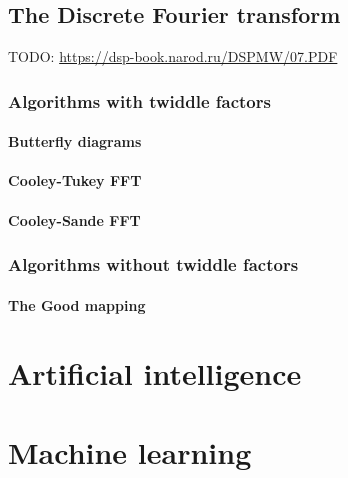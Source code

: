\section{The Discrete Fourier transform}
TODO: \url{https://dsp-book.narod.ru/DSPMW/07.PDF}
\subsection{Algorithms with twiddle factors}
\subsubsection{Butterfly diagrams}
\subsubsection{Cooley-Tukey FFT}
\subsubsection{Cooley-Sande FFT}

\subsection{Algorithms without twiddle factors}
\subsubsection{The Good mapping}





\chapter{Artificial intelligence}
\chapter{Machine learning}